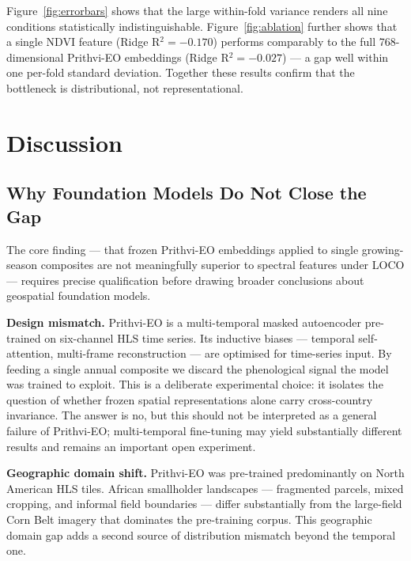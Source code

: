\documentclass[journal]{IEEEtran}
\begin{document}
Figure~\ref{fig:errorbars} shows that the large within-fold variance renders
all nine conditions statistically indistinguishable.
Figure~\ref{fig:ablation} further shows that a single NDVI feature
(Ridge R$^2 = -0.170$) performs comparably to the full 768-dimensional
Prithvi-EO embeddings (Ridge R$^2 = -0.027$) — a gap well within
one per-fold standard deviation.
Together these results confirm that the bottleneck is distributional,
not representational.

\section{Discussion}
\label{sec:discussion}

\subsection{Why Foundation Models Do Not Close the Gap}

The core finding — that frozen Prithvi-EO embeddings applied to single
growing-season composites are not meaningfully superior to spectral features
under LOCO — requires precise qualification before drawing broader conclusions
about geospatial foundation models.

\textbf{Design mismatch.}
Prithvi-EO is a multi-temporal masked autoencoder pre-trained on six-channel
HLS time series. Its inductive biases — temporal self-attention, multi-frame
reconstruction — are optimised for time-series input.
By feeding a single annual composite we discard the phenological signal the
model was trained to exploit.
This is a deliberate experimental choice: it isolates the question of whether
frozen spatial representations alone carry cross-country invariance.
The answer is no, but this should not be interpreted as a general failure
of Prithvi-EO; multi-temporal fine-tuning may yield substantially different
results and remains an important open experiment.

\textbf{Geographic domain shift.}
Prithvi-EO was pre-trained predominantly on North American HLS tiles.
African smallholder landscapes — fragmented parcels, mixed cropping, and
informal field boundaries — differ substantially from the large-field
Corn Belt imagery that dominates the pre-training corpus.
This geographic domain gap adds a second source of distribution mismatch
beyond the temporal one.
\end{document}

